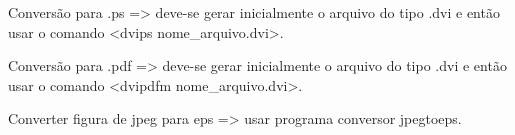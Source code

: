 

Convers\~{a}o para .ps => deve-se gerar inicialmente o arquivo do tipo .dvi
e ent\~{a}o usar o comando <dvips nome_arquivo.dvi>.

Convers\~{a}o para .pdf => deve-se gerar inicialmente o arquivo do tipo .dvi
e ent\~{a}o usar o comando  <dvipdfm nome_arquivo.dvi>.

Converter figura de jpeg para eps => usar programa conversor jpegtoeps.